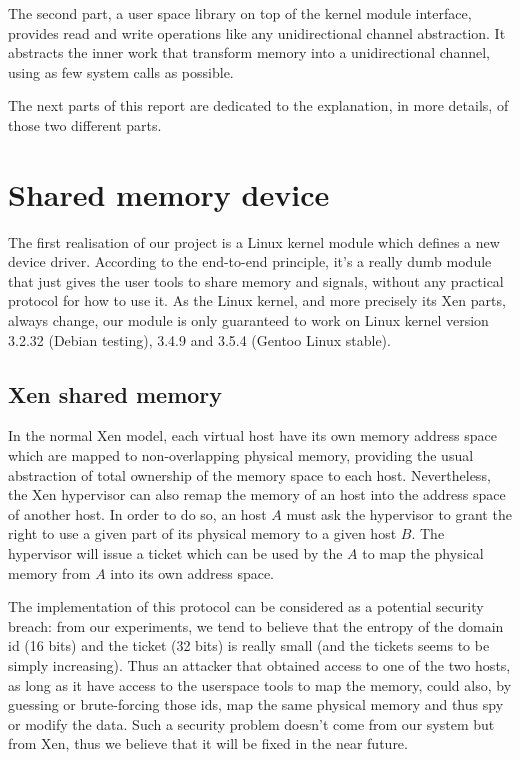 \documentclass[journal]{IEEEtran}
\begin{document}
The second part, a user space library on top of the kernel module interface, provides read and write operations like any unidirectional channel abstraction. It abstracts the inner work that transform memory into a unidirectional channel, using as few system calls as possible.

The next parts of this report are dedicated to the explanation, in more details, of those two different parts.

\section{Shared memory device}

The first realisation of our project is a Linux kernel module which defines a new device driver. According to the end-to-end principle, it's a really dumb module that just gives the user tools to share memory and signals, without any practical protocol for how to use it. As the Linux kernel, and more precisely its Xen parts, always change, our module is only guaranteed to work on Linux kernel version 3.2.32 (Debian testing), 3.4.9 and 3.5.4 (Gentoo Linux stable).

\subsection{Xen shared memory}

In the normal Xen model, each virtual host have its own memory address space which are mapped to non-overlapping physical memory, providing the usual abstraction of total ownership of the memory space to each host. Nevertheless, the Xen hypervisor can also remap the memory of an host into the address space of another host. In order to do so, an host $A$ must ask the hypervisor to grant the right to use a given part of its physical memory to a given host $B$. The hypervisor will issue a ticket which can be used by the $A$ to map the physical memory from $A$ into its own address space.

The implementation of this protocol can be considered as a potential security breach: from our experiments, we tend to believe that the entropy of the domain id (16 bits) and the ticket (32 bits) is really small (and the tickets seems to be simply increasing). Thus an attacker that obtained access to one of the two hosts, as long as it have access to the userspace tools to map the memory, could also, by guessing or brute-forcing those ids, map the same physical memory and thus spy or modify the data. Such a security problem doesn't come from our system but from Xen, thus we believe that it will be fixed in the near future.
\end{document}
